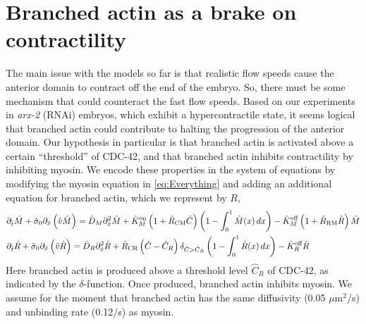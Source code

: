 \documentclass[11pt]{article}
\newcommand{\red}[1]{\color{red}#1\normalcolor}
\newcommand{\6}[1]{#1_{\text{6}}}
\newcommand{\3}[1]{#1_{\text{3}}}
\begin{document}
\section{Branched actin as a brake on contractility }
The main issue with the models so far is that realistic flow speeds cause the anterior domain to contract off the end of the embryo. So, there must be some mechanism that could counteract the fast flow speeds. Based on our experiments in \emph{arx-2} (RNAi) embryos, which exhibit a hypercontractile state, it seems logical that branched actin could contribute to halting the progression of the anterior domain. Our hypothesis in particular is that branched actin is activated above a certain ``threshold'' of CDC-42, and that branched actin inhibits contractility by inhibiting myosin. We encode these properties in the system of equations by modifying the myosin equation in \eqref{eq:Everything} and adding an additional equation for branched actin, which we represent by $R$,  
\begin{align}
\nonumber
&\partial_{\hat{t}} \hat{M} +\hat{\sigma}_0  \partial_{\hat{x}} \left(\hat{v} \hat{M} \right) =\hat{D}_M \partial_{\hat{x}}^2 \hat{M} +\hat{K}^\text{on}_M \left(1+\hat{R}_\text{CM} \hat C\right) \left(1-\int_0^1  \hat{M}(x) \, dx\right)- \hat{K}^\text{off}_M \left(1+\hat R_\text{RM} \hat R\right) \hat{M}\\
\label{eq:BAll}
&\partial_{\hat{t}} \hat{R} +\hat{\sigma}_0  \partial_{\hat{x}} \left(\hat{v} \hat{R} \right) =\hat{D}_R \partial_{\hat{x}}^2 \hat{R} +\hat R_\text{CR} \left(\hat C-\hat C_R\right) {\delta}_{\hat C > \hat C_R} \left(1-\int_0^1  \hat{R}(x) \, dx\right)- \hat{K}^\text{off}_R \hat{R}
\end{align}
Here branched actin is produced above a threshold level $\hat C_R$ of CDC-42, as indicated by the $\delta$-function. Once produced, branched actin inhibits myosin. \red{We assume for the moment that branched actin has the same diffusivity (0.05 $\mu$m$^2$/s) and unbinding rate (0.12/s) as myosin.}
\end{document}
